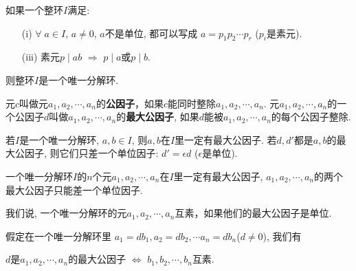 \begin{Theorem}
如果一个整环$I$满足:
\begin{itemize}
	\item[(i)] $\forall \; a \in I$, $a \neq 0$, $a$不是单位, 都可以写成
	$a = p_1 p_2 \cdots p_r$ ($p_i$是素元). 
	\item[(iii)] 素元$p \mid ab$ $\Rightarrow$ $p \mid a$或$p \mid b$. 
\end{itemize}
则整环$I$是一个唯一分解环.
\end{Theorem}

\begin{Definition}[公因子]
元$c$叫做元$a_1, a_2, \cdots, a_n$的\textbf{公因子}，如果$c$能同时整除$a_1, a_2, \cdots, a_n$. 元$a_1, a_2, \cdots, a_n$的一个公因子$d$叫做$a_1, a_2, \cdots, a_n$的\textbf{最大公因子}, 如果$d$能被$a_1, a_2, \cdots, a_n$的每个公因子整除.
\end{Definition}

\begin{Theorem}
若$I$是一个唯一分解环, $a, b \in I$, 则$a, b$在$I$里一定有最大公因子. 若$d, d'$都是$a, b$的最大公因子, 则它们只差一个单位因子: $d' = \epsilon d$ ($\epsilon$是单位).
\end{Theorem}

\begin{Corollary}
一个唯一分解环$I$的$n$个元$a_1, a_2, \cdots, a_n$在$I$里一定有最大公因子, $a_1, a_2, \cdots, a_n$的两个最大公因子只能差一个单位因子.
\end{Corollary}

\begin{Definition}[互素]
我们说, 一个唯一分解环的元$a_1, a_2, \cdots, a_n$互素，如果他们的最大公因子是单位.
\end{Definition}

\begin{Proposition}
假定在一个唯一分解环里
$a_1 = d b_1, a_2 = d b_2, \cdots a_n = d b_n$($d \ne 0$), 我们有
\begin{tightcenter}
$d$是$a_1, a_2, \cdots, a_n$的最大公因子 $\Leftrightarrow$ $b_1, b_2, \cdots, b_n$互素.
\end{tightcenter}
\end{Proposition}


